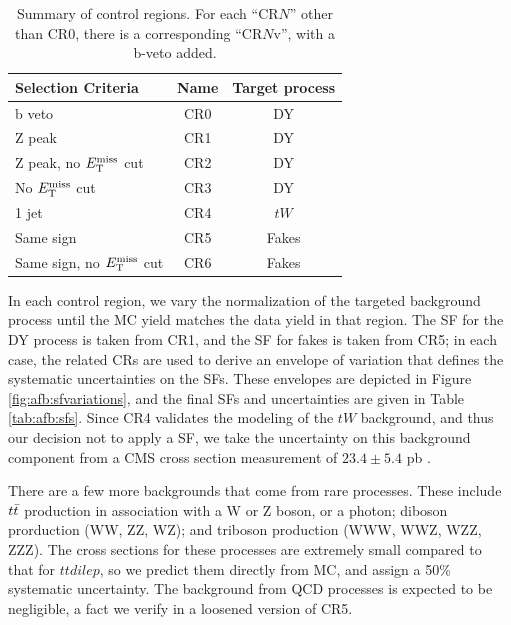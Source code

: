 \begin{table}[h]
\begin{center}
\caption{Summary of control regions. For each ``CR$N$'' other than
  CR0, there is a corresponding ``CR$N$v'', with a b-veto added.}
\label{tab:afb:crdefs}
{\small
\begin{tabular}{l|c c}
\hline
Selection Criteria & Name & Target process  \\
\hline
b veto & CR0 & DY \\
\hline
Z peak & CR1 & DY \\
\hline
Z peak, no $E_\text{T}^\text{miss}$ cut & CR2 & DY \\
\hline
No $E_\text{T}^\text{miss}$ cut & CR3 & DY \\
\hline
1 jet & CR4 & $tW$  \\
\hline
Same sign & CR5 & Fakes \\
\hline
Same sign, no $E_\text{T}^\text{miss}$ cut & CR6 & Fakes \\
\hline
\end{tabular}
}
\end{center}
\end{table}

In each control region, we vary the normalization of the targeted
background process until the MC yield matches the data yield in that
region. The SF for the DY process is taken from CR1, and the SF for
fakes is taken from CR5; in each case, the related CRs are used to
derive an envelope of variation that defines the systematic
uncertainties on the SFs. These envelopes are depicted in Figure
\ref{fig:afb:sfvariations}, and the final SFs and uncertainties are
given in Table \ref{tab:afb:sfs}. Since CR4 validates the modeling of
the $tW$ background, and thus our decision not to apply a SF, we take
the uncertainty on this background component from a CMS cross section
measurement of $23.4 \pm 5.4$ pb \cite{twxsec}.

There are a few more backgrounds that come from rare processes. These
include $t\bar{t}$ production in association with a W or Z boson, or a
photon; diboson prorduction (WW, ZZ, WZ); and triboson production
(WWW, WWZ, WZZ, ZZZ). The cross sections for these processes are
extremely small compared to that for $ttdilep$, so we predict them
directly from MC, and assign a 50\% systematic uncertainty. The
background from QCD processes is expected to be negligible, a fact we
verify in a loosened version of CR5.

